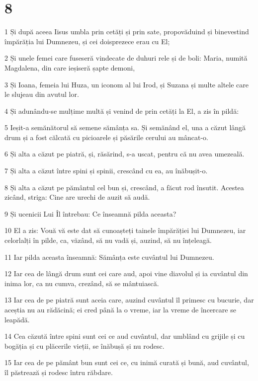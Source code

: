 \chapter{8}

\par 1 Și după aceea Iisus umbla prin cetăți și prin sate, propovăduind și binevestind împărăția lui Dumnezeu, și cei doisprezece erau cu El;
\par 2 Și unele femei care fuseseră vindecate de duhuri rele și de boli: Maria, numită Magdalena, din care ieșiseră șapte demoni,
\par 3 Și Ioana, femeia lui Huza, un iconom al lui Irod, și Suzana și multe altele care le slujeau din avutul lor.
\par 4 Și adunându-se mulțime multă și venind de prin cetăți la El, a zis în pildă:
\par 5 Ieșit-a semănătorul să semene sămânța sa. Și semănând el, una a căzut lângă drum și a fost călcată cu picioarele și păsările cerului au mâncat-o.
\par 6 Și alta a căzut pe piatră, și, răsărind, s-a uscat, pentru că nu avea umezeală.
\par 7 Și alta a căzut între spini și spinii, crescând cu ea, au înăbușit-o.
\par 8 Și alta a căzut pe pământul cel bun și, crescând, a făcut rod însutit. Acestea zicând, striga: Cine are urechi de auzit să audă.
\par 9 Și ucenicii Lui Îl întrebau: Ce înseamnă pilda aceasta?
\par 10 El a zis: Vouă vă este dat să cunoașteți tainele împărăției lui Dumnezeu, iar celorlalți în pilde, ca, văzând, să nu vadă și, auzind, să nu înțeleagă.
\par 11 Iar pilda aceasta înseamnă: Sămânța este cuvântul lui Dumnezeu.
\par 12 Iar cea de lângă drum sunt cei care aud, apoi vine diavolul și ia cuvântul din inima lor, ca nu cumva, crezând, să se mântuiască.
\par 13 Iar cea de pe piatră sunt aceia care, auzind cuvântul îl primesc cu bucurie, dar aceștia nu au rădăcină; ei cred până la o vreme, iar la vreme de încercare se leapădă.
\par 14 Cea căzută între spini sunt cei ce aud cuvântul, dar umblând cu grijile și cu bogăția și cu plăcerile vieții, se înăbușă și nu rodesc.
\par 15 Iar cea de pe pământ bun sunt cei ce, cu inimă curată și bună, aud cuvântul, îl păstrează și rodesc întru răbdare.
